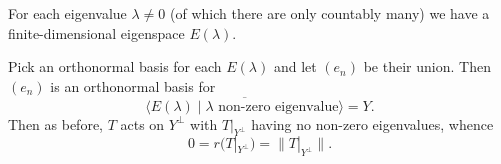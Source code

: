 \documentclass[12pt]{article}
\begin{document}
\begin{proofbox}
	For each eigenvalue $\lambda \neq 0$ (of which there are only countably many) we have a finite-dimensional eigenspace $E(\lambda)$.

	Pick an orthonormal basis for each $E(\lambda)$ and let $(e_n)$ be their union. Then $(e_n)$ is an orthonormal basis for
	\[
		\overline{\langle E(\lambda) \mid \lambda \text{ non-zero eigenvalue} \rangle} = Y.
	\]
	Then as before, $T$ acts on $Y^{\perp}$ with $T|_{Y^{\perp}}$ having no non-zero eigenvalues, whence
	\[
		0 = r(T|_{Y^{\perp}}) = \|T|_{Y^{\perp}}\|.
	\]
\end{proofbox}


\newpage

\printindex
\end{document}
